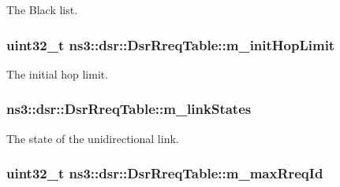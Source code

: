 The Black list. 

\subsubsection[{\texorpdfstring{m\+\_\+init\+Hop\+Limit}{m_initHopLimit}}]{\setlength{\rightskip}{0pt plus 5cm}uint32\+\_\+t ns3\+::dsr\+::\+Dsr\+Rreq\+Table\+::m\+\_\+init\+Hop\+Limit\hspace{0.3cm}{\ttfamily [private]}}\hypertarget{classns3_1_1dsr_1_1DsrRreqTable_a4cb16174a46751999a3671b851cd4d38}{}\label{classns3_1_1dsr_1_1DsrRreqTable_a4cb16174a46751999a3671b851cd4d38}


The initial hop limit. 

\subsubsection[{\texorpdfstring{m\+\_\+link\+States}{m_linkStates}}]{ ns3\+::dsr\+::\+Dsr\+Rreq\+Table\+::m\+\_\+link\+States\hspace{0.3cm}{\ttfamily [private]}}\hypertarget{classns3_1_1dsr_1_1DsrRreqTable_a40714429405484d753e0b435e4470e2d}{}\label{classns3_1_1dsr_1_1DsrRreqTable_a40714429405484d753e0b435e4470e2d}


The state of the unidirectional link. 

\subsubsection[{\texorpdfstring{m\+\_\+max\+Rreq\+Id}{m_maxRreqId}}]{\setlength{\rightskip}{0pt plus 5cm}uint32\+\_\+t ns3\+::dsr\+::\+Dsr\+Rreq\+Table\+::m\+\_\+max\+Rreq\+Id\hspace{0.3cm}{\ttfamily [private]}}\hypertarget{classns3_1_1dsr_1_1DsrRreqTable_a8f382a2a8f2b211480187ea2520dc936}{}\label{classns3_1_1dsr_1_1DsrRreqTable_a8f382a2a8f2b211480187ea2520dc936}


